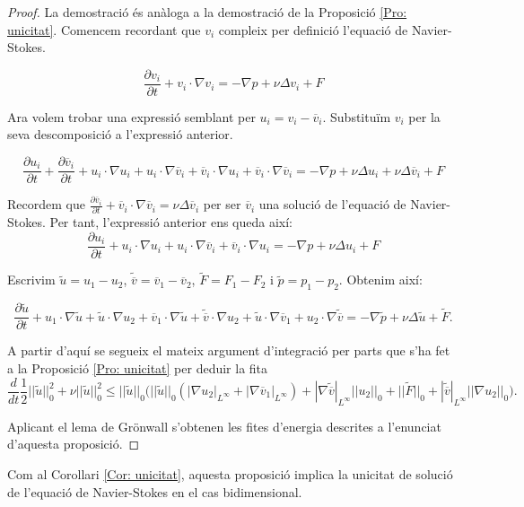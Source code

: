 \documentclass{article}
\numberwithin{equation}{section}
\begin{document}
\begin{proof}
La demostraci\'{o} \'{e}s an\`{a}loga a la demostraci\'{o} de la Proposici\'{o} \ref{Pro: unicitat}. Comencem recordant que $v_i$ compleix per definici\'{o} l'equaci\'{o} de Navier-Stokes.

\[\frac{\partial v_i}{\partial t}+v_i\cdot\nabla v_i=-\nabla p+\nu\Delta v_i+F\]

Ara volem trobar una expressi\'{o} semblant per $u_i=v_i-\overline v_i$. Substitu\"{i}m $v_i$ per la seva descomposici\'{o} a l'expressi\'{o} anterior.

\[\frac{\partial u_i}{\partial t}+\frac{\partial\overline v_i}{\partial t}+u_i\cdot\nabla u_i+u_i\cdot\nabla\overline v_i+\overline v_i\cdot\nabla u_i+\overline v_i\cdot\nabla\overline v_i=-\nabla p+\nu\Delta u_i+\nu\Delta\overline v_i+F\]

Recordem que $\frac{\partial\overline v_i}{\partial t}+\overline v_i\cdot\nabla\overline v_i=\nu\Delta\overline v_i$ per ser $\overline v_i$ una soluci\'{o} de l'equaci\'{o} de Navier-Stokes. Per tant, l'expressi\'{o} anterior ens queda aix\'{i}:
\[\frac{\partial u_i}{\partial t}+u_i\cdot\nabla u_i+u_i\cdot\nabla\overline v_i+\overline v_i\cdot\nabla u_i=-\nabla p+\nu\Delta u_i+F\]

Escrivim $\tilde u=u_1-u_2$, $\tilde{\overline v}=\overline v_1-\overline v_2$, $\tilde F=F_1-F_2$ i $\tilde p=p_1-p_2$. Obtenim aix\'{i}:

\[\frac{\partial\tilde u}{\partial t}+u_1\cdot\nabla\tilde u+\tilde u\cdot\nabla u_2+\overline v_1\cdot\nabla\tilde u+\tilde{\overline v}\cdot\nabla u_2+\tilde u\cdot\nabla\overline v_1+u_2\cdot\nabla\tilde{\overline v}=-\nabla\tilde p+\nu\Delta\tilde u+\tilde F.\]

A partir d'aqu\'{i} se segueix el mateix argument d'integraci\'{o} per parts que s'ha fet a la Proposici\'{o} \ref{Pro: unicitat} per deduir la fita
\[\frac{d}{dt}\frac{1}{2}||\tilde u||_0^2+\nu||\tilde u||_0^2\leq||\tilde u||_0\Big(||\tilde u||_0(|\nabla u_2|_{L^{\infty}}+|\nabla\overline v_1|_{L^{\infty}})+|\nabla\tilde{\overline v}|_{L^{\infty}}||u_2||_0+||\tilde F||_0+|\tilde{\overline v}|_{L^{\infty}}||\nabla u_2||_0\Big).\]

Aplicant el lema de Gr\"{o}nwall s'obtenen les fites d'energia descrites a l'enunciat d'aquesta proposici\'{o}.
\end{proof}

Com al Corol\textperiodcentered lari \ref{Cor: unicitat}, aquesta proposici\'{o} implica la unicitat de soluci\'{o} de l'equaci\'{o} de Navier-Stokes en el cas bidimensional.
\end{document}
